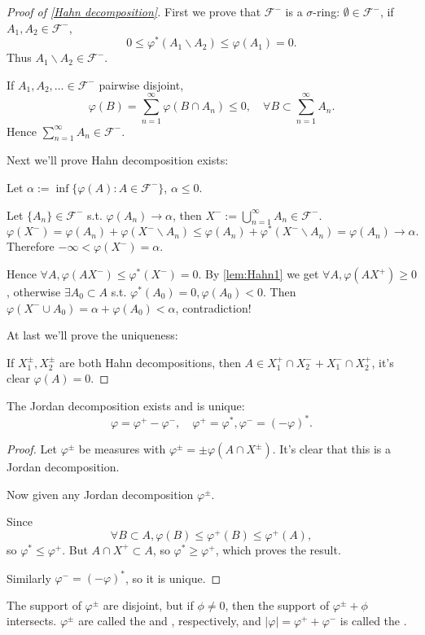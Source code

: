 \begin{proof}[Proof of \autoref{Hahn decomposition}]
    First we prove that $\mathscr{F}^-$ is a $\sigma$-ring:
	$\emptyset\in \mathscr{F}^-$, if $A_1, A_2\in \mathscr{F}^-$,
	\[
	0 \le \varphi^*(A_1 \backslash A_2)\le \varphi(A_1) = 0.
	\]
	Thus $A_1 \backslash A_2 \in \mathscr{F}^-$.

	If $A_1, A_2,\dots \in \mathscr{F}^-$ pairwise disjoint,
	\[
	\varphi(B) = \sum_{n=1}^{\infty} \varphi(B\cap A_n) \le 0, \quad
	\forall B \subset \sum_{n=1}^{\infty} A_n.
	\]
	Hence $\sum_{n=1}^\infty A_n \in \mathscr{F}^-$.

	Next we'll prove Hahn decomposition exists:

	Let $\alpha := \inf \{\varphi(A) : A\in \mathscr{F}^-\}$, $\alpha \le 0$.

	Let $\{A_n\}\in \mathscr{F}^-$ s.t. $\varphi(A_n) \to \alpha$,
	then $X^- := \bigcup_{n=1}^\infty A_n \in \mathscr{F}^-$.
	\[
	\varphi(X^-) = \varphi(A_n) + \varphi(X^- \backslash A_n)
	\le \varphi(A_n) + \varphi^*(X^- \backslash A_n) = \varphi(A_n) \to \alpha.
	\]
	Therefore $-\infty < \varphi(X^-) = \alpha$.

	Hence $\forall A, \varphi(AX^-) \le \varphi^*(X^-) = 0$.
	By \autoref{lem:Hahn1} we get $\forall A, \varphi(AX^+) \ge 0$,
	otherwise $\exists A_0 \subset A$ s.t. $\varphi^*(A_0) = 0, \varphi(A_0) < 0$.
	Then $\varphi(X^- \cup A_0) = \alpha + \varphi(A_0) < \alpha$, contradiction!

	At last we'll prove the uniqueness:

	If $X_1^{\pm}, X_2^{\pm}$ are both Hahn decompositions,
	then $A \in X_1^+\cap X_2^- + X_1^- \cap X_2^+$, it's clear $\varphi(A) = 0$.
\end{proof}

\begin{theorem}
    The Jordan decomposition exists and is unique:
	\[
	\varphi = \varphi^+ - \varphi^-, \quad
	\varphi^+ = \varphi^*, \varphi^- = (-\varphi)^*.
	\]
\end{theorem}
\begin{proof}[Proof]
    Let $\varphi^{\pm}$ be measures with $\varphi^{\pm} = \pm\varphi(A\cap X^{\pm})$.
	It's clear that this is a Jordan decomposition.

	Now given any Jordan decomposition $\varphi^{\pm}$.

	Since
	\[
		\forall B \subset A, \varphi(B)\le \varphi^+(B) \le \varphi^+(A),
	\]
	so $\varphi^* \le \varphi^+$.
	But $A \cap X^+ \subset A$, so $\varphi^* \ge \varphi^+$,
	which proves the result.

	Similarly $\varphi^- = (-\varphi)^*$, so it is unique.
\end{proof}
\begin{remark}
    The support of $\varphi^{\pm}$ are disjoint, but if $\phi \ne 0$,
	then the support of $\varphi^{\pm} + \phi$ intersects.
	$\varphi^{\pm}$ are called the 
	and ,
	respectively, and $|\varphi| = \varphi^+ + \varphi^-$ is called the
	.
\end{remark}

